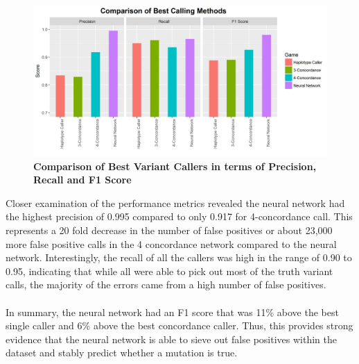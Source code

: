 \documentclass{article}
\begin{document}
\begin{figure}[H]
\includegraphics[width=\textwidth]{masonheadsupcomparison.jpg}
\caption{\textbf{Comparison of Best Variant Callers in terms of Precision, Recall and F1 Score}}
\centering
\end{figure}
Closer examination of the performance metrics revealed the neural network had the highest precision of 0.995 compared to only 0.917 for 4-concordance call. This represents  a 20 fold decrease in the number of false positives or about 23,000 more false positive calls in the 4 concordance network compared to the neural network. Interestingly, the recall of all the callers was high in the range of 0.90 to 0.95, indicating that while all were able to pick out most of the truth variant calls, the majority of the errors came from a high number of false positives.\\\\ 
In summary, the neural network had an F1 score that was 11\% above the best single caller and 6\% above the best concordance caller. Thus, this provides strong evidence that the neural network is able to sieve out false positives within the dataset and stably predict whether a mutation is true.
\end{document}
